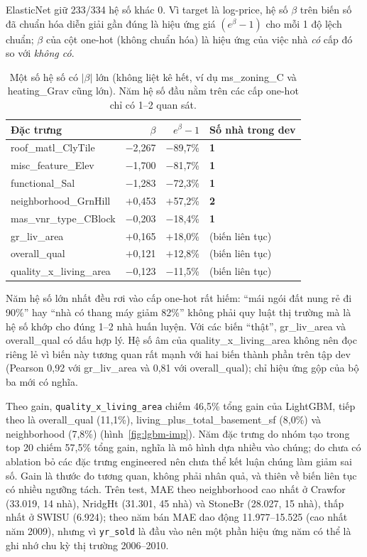 ElasticNet giữ 233/334 hệ số khác 0. Vì target là log-price, hệ số $\beta$ trên biến số đã chuẩn hóa diễn giải
gần đúng là hiệu ứng giá $(e^{\beta}-1)$ cho mỗi 1 độ lệch chuẩn; $\beta$ của cột one-hot (không chuẩn hóa) là hiệu
ứng của việc nhà \emph{có} cấp đó so với \emph{không có}.

\begin{table}[H]
\centering\small
\begin{tabular}{lrrl}
\toprule
Đặc trưng & $\beta$ & $e^{\beta}-1$ & Số nhà trong dev \\
\midrule
roof\_matl\_ClyTile & $-$2,267 & $-$89,7\% & \textbf{1} \\
misc\_feature\_Elev & $-$1,700 & $-$81,7\% & \textbf{1} \\
functional\_Sal & $-$1,283 & $-$72,3\% & \textbf{1} \\
neighborhood\_GrnHill & $+$0,453 & $+$57,2\% & \textbf{2} \\
mas\_vnr\_type\_CBlock & $-$0,203 & $-$18,4\% & \textbf{1} \\
gr\_liv\_area & $+$0,165 & $+$18,0\% & (biến liên tục) \\
overall\_qual & $+$0,121 & $+$12,8\% & (biến liên tục) \\
quality\_x\_living\_area & $-$0,123 & $-$11,5\% & (biến liên tục) \\
\bottomrule
\end{tabular}
\caption{Một số hệ số có $|\beta|$ lớn (không liệt kê hết, ví dụ ms\_zoning\_C và heating\_Grav cũng lớn). Năm hệ số
đầu nằm trên các cấp one-hot chỉ có 1--2 quan sát.}
\end{table}

Năm hệ số lớn nhất đều rơi vào cấp one-hot rất hiếm: ``mái ngói đất nung rẻ đi 90\%'' hay ``nhà có thang máy giảm
82\%'' không phải quy luật thị trường mà là hệ số khớp cho đúng 1--2 nhà huấn luyện. Với các biến ``thật'',
gr\_liv\_area và overall\_qual có dấu hợp lý. Hệ số âm của quality\_x\_living\_area không nên đọc riêng lẻ vì biến
này tương quan rất mạnh với hai biến thành phần trên tập dev (Pearson 0,92 với gr\_liv\_area và 0,81 với
overall\_qual); chỉ hiệu ứng gộp của bộ ba mới có nghĩa.

Theo gain, \texttt{quality\_x\_living\_area} chiếm 46,5\% tổng gain của LightGBM, tiếp theo là overall\_qual
(11,1\%), living\_plus\_total\_basement\_sf (8,0\%) và neighborhood (7,8\%) (hình~\ref{fig:lgbm-imp}). Năm đặc trưng
do nhóm tạo trong top 20 chiếm 57,5\% tổng gain, nghĩa là mô hình dựa nhiều vào chúng; do chưa có ablation bỏ các
đặc trưng engineered nên chưa thể kết luận chúng làm giảm sai số. Gain là thước đo tương quan, không phải nhân
quả, và thiên về biến liên tục có nhiều ngưỡng tách. Trên test, MAE theo neighborhood cao nhất ở Crawfor (33.019,
14 nhà), NridgHt (31.301, 45 nhà) và StoneBr (28.027, 15 nhà), thấp nhất ở SWISU (6.924); theo năm bán MAE dao động
11.977--15.525 (cao nhất năm 2009), nhưng vì \texttt{yr\_sold} là đầu vào nên một phần hiệu ứng năm có thể là ghi
nhớ chu kỳ thị trường 2006--2010.

